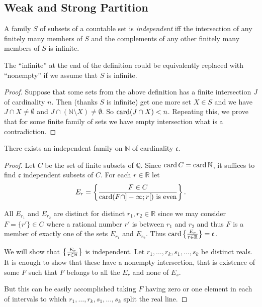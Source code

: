\subsection{Weak and Strong Partition}
\begin{defn}
A family $S$ of subsets of a countable
set is \emph{independent} iff the intersection of any finitely many
members of $S$ and the complements of any other finitely many members
of $S$ is infinite.\end{defn}
\begin{lem}
The ``infinite'' at the end of the definition could be equivalently
replaced with ``nonempty'' if we assume that $S$ is infinite.\end{lem}
\begin{proof}
Suppose that some sets from the above definition has a finite intersection
$J$ of cardinality $n$. Then (thanks $S$ is infinite) get one more
set $X\in S$ and we have $J\cap X\ne\emptyset$ and $J\cap(\mathbb{N}\setminus X)\ne\emptyset$.
So $\operatorname{card}(J\cap X)<n$. Repeating this, we prove that for some finite
family of sets we have empty intersection what is a contradiction.\end{proof}
\begin{lem}
There exists an independent family on $\mathbb{N}$ of cardinality
$\mathfrak{c}$.\end{lem}
\begin{proof}
Let $C$ be the set of finite subsets of $\mathbb{Q}$. Since $\operatorname{card} C=\operatorname{card}\mathbb{N}$,
it suffices to find $\mathfrak{c}$ independent subsets of $C$. For
each $r\in\mathbb{R}$ let
\[
E_{r}=\left\{ \frac{F\in C}{\operatorname{card}(F\cap]-\infty;r[)\text{ is even}}\right\}.
\]


All $E_{r_{1}}$ and $E_{r_{2}}$ are distinct for distinct $r_{1},r_{2}\in\mathbb{R}$
since we may consider $F=\{r'\}\in C$ where a rational number $r'$
is between $r_{1}$ and $r_{2}$ and thus $F$ is a member of exactly
one of the sets $E_{r_{1}}$ and $E_{r_{2}}$. Thus $\operatorname{card}\left\{ \frac{E_{r}}{r\in\mathbb{R}}\right\}=\mathfrak{c}$.

We will show that $\left\{ \frac{E_{r}}{r\in\mathbb{R}}\right\}$ is independent.
Let $r_{1},\dots,r_{k},s_{1},\ldots,s_{k}$ be distinct reals. It
is enough to show that these have a nonempty intersection, that is
existence of some $F$ such that $F$ belongs to all the $E_{r}$
and none of $E_{s}$.

But this can be easily accomplished taking $F$ having zero or one
element in each of intervals to which $r_{1},\ldots,r_{k},s_{1},\ldots,s_{k}$
split the real line.\end{proof}
